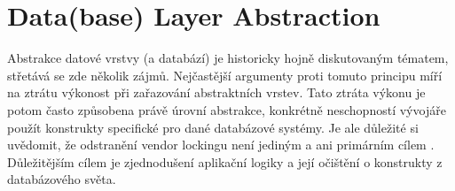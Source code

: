 \section{Data(base) Layer Abstraction}
Abstrakce datové vrstvy (a databází) je historicky hojně diskutovaným tématem, %
střetává se zde několik zájmů. Nejčastější argumenty proti tomuto principu míří na 
ztrátu výkonost při zařazování abstraktních vrstev. Tato ztráta výkonu je potom často způsobena 
právě úrovní abstrakce, konkrétně neschopností vývojáře použít konstrukty specifické pro dané databázové systémy. 
Je ale důležité si uvědomit, že odstranění vendor lockingu není jediným a ani primárním cílem .
Důležitějším cílem je zjednodušení aplikační logiky a její očištění o konstrukty z databázového světa. 





